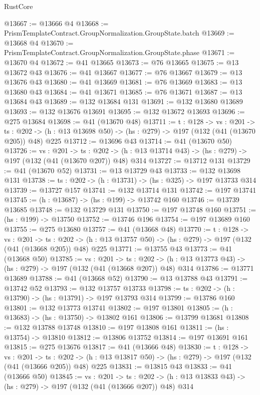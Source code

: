 \begin{lexlean}{RustCore}
\begin{coremodule}
@13667 := @13666 @4
@13668 := PrismTemplateContract.GroupNormalization.GroupState.batch
@13669 := @13668 @4
@13670 := PrismTemplateContract.GroupNormalization.GroupState.phase
@13671 := @13670 @4
@13672 := @41 @13665
@13673 := @76 @13665
@13675 := @13 @13672 @43
@13676 := @41 @13667
@13677 := @76 @13667
@13679 := @13 @13676 @43
@13680 := @41 @13669
@13681 := @76 @13669
@13683 := @13 @13680 @43
@13684 := @41 @13671
@13685 := @76 @13671
@13687 := @13 @13684 @43
@13689 := @132 @13684 @131
@13691 := @132 @13680 @13689
@13693 := @132 @13676 @13691
@13695 := @132 @13672 @13693
@13696 := @275 @13684
@13698 := @41 (@13670 @48)
@13711 := {t : @128} ->
  {vs : @201} ->
  {ts : @202} -> (h : @13 @13698 @50) -> (hs : @279) -> @197 (@132 (@41 (@13670 @205)) @48) @225
@13712 := @13696 @43
@13714 := @41 (@13670 @50)
@13726 := {vs : @201} ->
  {ts : @202} -> (h : @13 @13714 @43) -> (hs : @279) -> @197 (@132 (@41 (@13670 @207)) @48) @314
@13727 := @13712 @131
@13729 := @41 (@13670 @52)
@13731 := @13 @13729 @43
@13733 := @132 @13698 @131
@13738 := {ts : @202} -> (h : @13731) -> (hs : @325) -> @197 @13733 @314
@13739 := @13727 @157
@13741 := @132 @13714 @131
@13742 := @197 @13741
@13745 := (h : @13687) -> (hs : @199) -> @13742 @160
@13746 := @13739 @13685
@13748 := @132 @13729 @131
@13750 := @197 @13748 @160
@13751 := (hs : @199) -> @13750
@13752 := @13746 @196
@13754 := @197 @13689 @160
@13755 := @275 @13680
@13757 := @41 (@13668 @48)
@13770 := {t : @128} ->
  {vs : @201} ->
  {ts : @202} -> (h : @13 @13757 @50) -> (hs : @279) -> @197 (@132 (@41 (@13668 @205)) @48) @225
@13771 := @13755 @43
@13773 := @41 (@13668 @50)
@13785 := {vs : @201} ->
  {ts : @202} -> (h : @13 @13773 @43) -> (hs : @279) -> @197 (@132 (@41 (@13668 @207)) @48) @314
@13786 := @13771 @13689
@13788 := @41 (@13668 @52)
@13790 := @13 @13788 @43
@13791 := @13742 @52
@13793 := @132 @13757 @13733
@13798 := {ts : @202} -> (h : @13790) -> (hs : @13791) -> @197 @13793 @314
@13799 := @13786 @160
@13801 := @132 @13773 @13741
@13802 := @197 @13801
@13805 := (h : @13683) -> (hs : @13750) -> @13802 @161
@13806 := @13799 @13681
@13808 := @132 @13788 @13748
@13810 := @197 @13808 @161
@13811 := (hs : @13754) -> @13810
@13812 := @13806 @13752
@13814 := @197 @13691 @161
@13815 := @275 @13676
@13817 := @41 (@13666 @48)
@13830 := {t : @128} ->
  {vs : @201} ->
  {ts : @202} -> (h : @13 @13817 @50) -> (hs : @279) -> @197 (@132 (@41 (@13666 @205)) @48) @225
@13831 := @13815 @43
@13833 := @41 (@13666 @50)
@13845 := {vs : @201} ->
  {ts : @202} -> (h : @13 @13833 @43) -> (hs : @279) -> @197 (@132 (@41 (@13666 @207)) @48) @314

\end{coremodule}
\end{lexlean}
